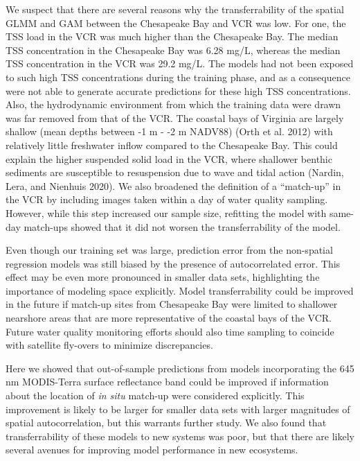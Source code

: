 \documentclass[11pt,]{article}
\begin{document}
We suspect that there are several reasons why the transferrability of
the spatial GLMM and GAM between the Chesapeake Bay and VCR was low. For
one, the TSS load in the VCR was much higher than the Chesapeake Bay.
The median TSS concentration in the Chesapeake Bay was 6.28 mg/L,
whereas the median TSS concentration in the VCR was 29.2 mg/L. The
models had not been exposed to such high TSS concentrations during the
training phase, and as a consequence were not able to generate accurate
predictions for these high TSS concentrations. Also, the hydrodynamic
environment from which the training data were drawn was far removed from
that of the VCR. The coastal bays of Virginia are largely shallow (mean
depths between -1 m - -2 m NADV88) (Orth et al. 2012) with relatively
little freshwater inflow compared to the Chesapeake Bay. This could
explain the higher suspended solid load in the VCR, where shallower
benthic sediments are susceptible to resuspension due to wave and tidal
action (Nardin, Lera, and Nienhuis 2020). We also broadened the
definition of a ``match-up'' in the VCR by including images taken within
a day of water quality sampling. However, while this step increased our
sample size, refitting the model with same-day match-ups showed that it
did not worsen the transferrability of the model.

Even though our training set was large, prediction error from the
non-spatial regression models was still biased by the presence of
autocorrelated error. This effect may be even more pronounced in smaller
data sets, highlighting the importance of modeling space explicitly.
Model transferrability could be improved in the future if match-up sites
from Chesapeake Bay were limited to shallower nearshore areas that are
more representative of the coastal bays of the VCR. Future water quality
monitoring efforts should also time sampling to coincide with satellite
fly-overs to minimize discrepancies.

Here we showed that out-of-sample predictions from models incorporating
the 645 nm MODIS-Terra surface reflectance band could be improved if
information about the location of \emph{in situ} match-up were
considered explicitly. This improvement is likely to be larger for
smaller data sets with larger magnitudes of spatial autocorrelation, but
this warrants further study. We also found that transferrability of
these models to new systems was poor, but that there are likely several
avenues for improving model performance in new ecosystems.

\newpage
\end{document}
